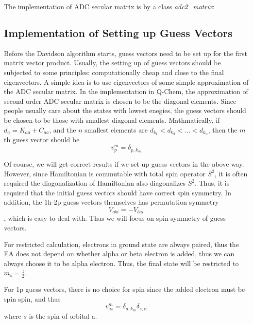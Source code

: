 The implementation of ADC secular matrix is by a class \emph{adc2\_matrix}:



\subsection{Implementation of Setting up Guess Vectors}

Before the Davidson algorithm starts, guess vectors need to be set up for the first matrix vector product.
Usually, the setting up of guess vectors should be subjected to some principles: computationally cheap and close to the final eigenvectors.
A simple idea is to use eigenvectors of some simple approximation of the ADC secular matrix.
In the implementation in Q-Chem, the approximation of second order ADC secular matrix is chosen to be the diagonal elements.
Since people usually care about the states with lowest enegies, the guess vectors should be chosen to be those with smallest diagonal elements.
Mathmatically, if $d_a=K_{aa}+C_{aa}$, and the $n$ smallest elements are $d_{k_1}<d_{k_2}< \dots <d_{k_n}$, then the $m$th guess vector should be 
\begin{equation}
	v^m_p=\delta_{p, k_m}
\end{equation}

Of course, we will get correct results if we set up guess vectors in the above way.
However, since Hamiltonian is commutable with total spin operator $S^2$, it is often required the diagonalization of Hamiltonian also diagonalizes $S^2$.
Thus, it is required that the initial guess vectors should have correct spin symmetry.
In addition, the 1h-2p guess vectors themselves has permutation symmetry
\begin{equation}
	V_{abi}=-V_{bai}
\end{equation}
, which is easy to deal with. Thus we will focus on spin symmetry of guess vectors.

For restricted calculation, electrons in ground state are always paired, thus the EA does not depend on whether alpha or beta electron is added, thus we can always choose it to be alpha electron.
Thus, the final state will be restricted to $m_s=\frac{1}{2}$.

For 1p guess vectors, there is no choice for spin since the added electron must be spin spin, and thus
\begin{equation}
	v^m_{a s}=\delta_{a, k_m} \delta_{s, \alpha}
\end{equation}
where $s$ is the spin of orbital a.

